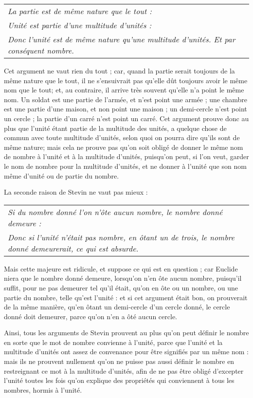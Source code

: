 	\begin{tabularx}{\textwidth}{X}
		\emph{La partie est de même nature que le tout :} \\
		\emph{Unité est partie d'une multitude d'unités :} \\
		\emph{Donc l'unité est de même nature qu'une multitude d'unités. Et par conséquent nombre.} \\
	\end{tabularx}

Cet argument ne vaut rien du tout ; car, quand la partie serait toujours de la même nature que le tout, il ne s'ensuivrait pas qu'elle dût toujours avoir le même nom que le tout; et, au contraire, il arrive très souvent qu'elle n'a point le même nom. Un soldat est une partie de l'armée, et n'est point une armée ; une chambre est une partie d'une maison, et non point une maison ; un demi-cercle n'est point un cercle ; la partie d'un carré n'est point un carré. Cet argument prouve donc au plus que l'unité étant partie de la multitude des unités, a quelque chose de commun avec toute multitude d'unités, selon quoi on pourra dire qu'ils sont de même nature; mais cela ne prouve pas qu'on soit obligé de donner le même nom de nombre à l'unité et à la multitude d'unités, puisqu'on peut, si l'on veut, garder le nom de nombre pour la multitude d'unités, et ne donner à l'unité que son nom même d'unité ou de partie du nombre.

La seconde raison de Stevin ne vaut pas mieux :

	\begin{tabularx}{\textwidth}{X}
		\emph{Si du nombre donné l'on n'ôte aucun nombre, le nombre donné demeure :}\\
		\emph{Donc si l'unité n'était pas nombre, en ôtant un de trois, le nombre donné demeurerait, ce qui est absurde.} \\
	\end{tabularx}


Mais cette majeure est ridicule, et suppose ce qui est en question ; car Euclide niera que le nombre donné demeure, lorsqu'on n'en ôte aucun nombre, puisqu'il suffit, pour ne pas demeurer tel qu'il était, qu'on en ôte ou un nombre, ou une partie du nombre, telle qu'est l'unité : et si cet argument était bon, on prouverait de la même manière, qu'en ôtant un demi-cercle d'un cercle donné, le cercle donné doit demeurer, parce qu'on n'en a ôté aucun cercle.

Ainsi, tous les arguments de Stevin prouvent au plus qu'on peut définir le nombre en sorte que le mot de nombre convienne à l'unité, parce que l'unité et la multitude d'unités ont assez de convenance pour être signifiés par un même nom : mais ils ne prouvent nullement qu'on ne puisse pas aussi définir le nombre en restreignant ce mot à la multitude d'unités, afin de ne pas être obligé d'excepter l'unité toutes les fois qu'on explique des propriétés qui conviennent à tous les nombres, hormis à l'unité.

